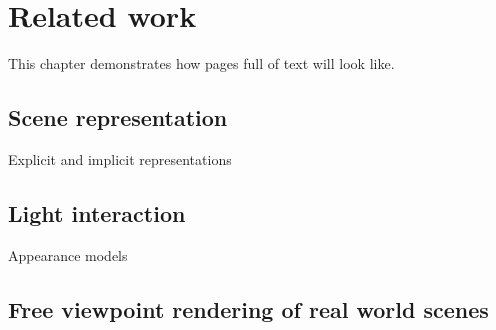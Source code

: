 \chapter{Related work}
\label{chap:related_work}

This chapter demonstrates how pages full of text will look like.


\section{Scene representation}

Explicit and implicit representations




\section{Light interaction}

Appearance models




\section{Free viewpoint rendering of real world scenes}


\lipsum[1-15]